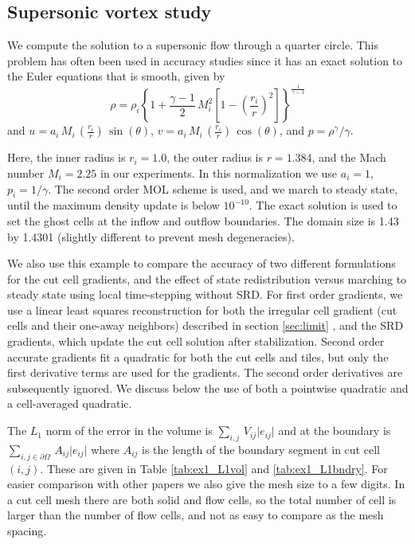 \subsection{Supersonic vortex study}\label{sec:ssv}
We compute the solution to a supersonic flow 
through a quarter circle.  This problem has often been used in accuracy 
studies \cite{aftosmis:acc} since it has an exact solution to the Euler
equations that is smooth, given by 
\begin{equation}
\rho = \rho_i \left \{ 1 + \frac{\gamma-1}{2} \, M_i^2 \left [ 1 - (\frac{r_i}{r})^2
\right ] \right \} ^
{\frac{1}{\gamma-1}}
\end{equation}
and $ u = a_i \, M_i \, (\frac{r_i}{r})\,  \sin (\theta)$, 
$ v = a_i\,  M_i\,  (\frac{r_i}{r})\,  \cos(\theta)$, and
$ p = \rho^\gamma / \gamma$.

Here, the inner radius is $r_i = 1.0$,  the outer radius
is $r = 1.384$, and the Mach number $M_i = 2.25$ in our experiments. In this
normalization we use $a_i = 1$, $p_i = 1/\gamma$. 
The second order MOL scheme is used, and we march
to steady state, until the maximum density update is below $10^{-10}$.  
The exact solution is used to set the ghost cells at the inflow and
outflow boundaries. The domain size is 1.43 by 1.4301 (slightly different
to prevent mesh  degeneracies).  

We also use this example to compare the accuracy of two different formulations
for the cut cell gradients, and the effect of state redistribution versus 
marching to steady state using local time-stepping without SRD.  
For first order gradients, we use a linear least squares reconstruction for
both the irregular cell gradient (cut cells and their one-away neighbors) 
described in section \ref{sec:limit} , and the SRD gradients, which 
update the cut cell solution after stabilization. Second order accurate 
gradients fit a quadratic for both
the cut cells and tiles, but only the first derivative terms are used for 
the gradients. The second order derivatives are subsequently ignored.  
We discuss below the use of both a pointwise quadratic and a cell-averaged
quadratic.



The $L_1$ norm of the error in the volume is $\sum_{i,j} \,
V_{ij} \lvert e_{ij } \rvert$ and at the boundary is $ \sum_{{i,j} \in \partial \Omega} \, A_{ij} \lvert e_{ij
} \rvert$ where $A_{ij}$ is the length of the boundary segment in cut cell $(i,j)$.
These are given in Table \ref{tab:ex1_L1vol} and \ref{tab:ex1_L1bndry}. 
For easier comparison with other papers we also give the mesh size 
to a few digits. In  a cut cell mesh there are both solid and
flow cells, so the total number of cell is larger than the number of
flow cells, and not as easy to compare as the mesh spacing.

